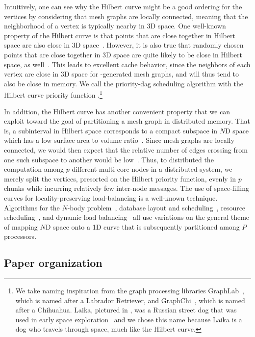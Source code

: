 Intuitively, one can see why the Hilbert curve might be a good
ordering for the vertices by considering that mesh graphs
are locally connected, meaning that the neighborhood of a vertex
is typically nearby in 3D space.  One well-known property
of the Hilbert curve is that points that are close together
in Hilbert space are also close in 3D space~\cite{GotsmanLi96}.  
However, it is also
true that randomly chosen points that are close together in 
3D space are quite likely to be close in Hilbert space, 
as well~\cite{MoonJaFa96,TirthapuraSeAl06}.
This leads to excellent cache behavior, since the neighbors of
each vertex are close in 3D space for -generated mesh graphs,
and will thus tend to also be close in memory.  We call the
priority-dag scheduling algorithm with the Hilbert curve priority
function .\footnote{We take naming inspiration from the
graph processing libraries GraphLab~\cite{LowBiGo12},
which is named after a Labrador Retriever, and 
GraphChi~\cite{KyrolaBlGu12}, which
is named after a Chihuahua.  Laika, pictured in , 
was a Russian street dog that was used in early space 
exploration~\cite{NYT57} and we chose this name
because Laika is a dog who travels through space, much like the Hilbert
curve.}


In addition, the Hilbert curve has another convenient property
that we can exploit toward the goal of partitioning a mesh graph
in distributed memory.  That is, a subinterval in Hilbert space
corresponds to a compact subspace in $N$D space which has a
low surface area to volume ratio~\cite{SinghHoHe93,WarrenSa93,PilkingtonBa96}.  
Since mesh graphs are locally connected, we would then expect 
that the relative number of edges crossing
from one such subspace to another would be low~\cite{MoonJaFa96}.  Thus, to
distributed the computation among $p$ different multi-core
nodes in a distributed system, we merely split the vertices, presorted
on the Hilbert priority function,
evenly in $p$ chunks while incurring relatively few inter-node
messages.  The use of space-filling curves for locality-preserving 
load-balancing is a well-known technique.  Algorithms 
for the $N$-body problem~\cite{SinghHoHe93,WarrenSa93},
database layout and scheduling~\cite{MoonJaFa96}, 
resource scheduling~\cite{LeungPhJo02}, and dynamic load 
balancing~\cite{HarlacherKlRo12} all use variations on the general
theme of mapping $N$D space onto a 1D curve that is 
subsequently partitioned among $P$ processors.


\subsection{Paper organization}

